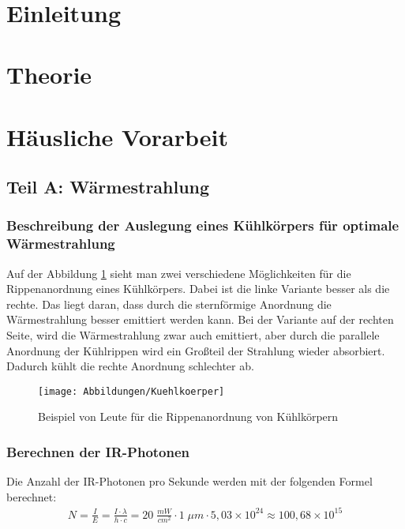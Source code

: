 \documentclass[a4paper]{scrartcl}
\def\header#1#2{
  \begin{center}
    {\Large #1}\\
    {#2}
  \end{center}
}
\numberwithin{equation}{subsection}
\begin{document}
\vspace{10pt}
\header{\HEADDING}{\SUBHEADDING}

\tableofcontents

\newpage

\section{Einleitung}

\newpage
\section{Theorie}

\newpage
\section{Häusliche Vorarbeit}
\subsection{Teil A: Wärmestrahlung}
\subsubsection{Beschreibung der Auslegung eines Kühlkörpers für optimale Wärmestrahlung}
Auf der Abbildung \ref{fig:kuehl} sieht man zwei verschiedene Möglichkeiten für die Rippenanordnung eines 
Kühlkörpers. Dabei ist die linke Variante besser als die rechte. Das liegt daran, dass durch die 
sternförmige Anordnung die Wärmestrahlung besser emittiert werden kann. Bei der Variante auf der rechten
Seite, wird die Wärmestrahlung zwar auch emittiert, aber durch die parallele Anordnung der Kühlrippen
wird ein Großteil der Strahlung wieder absorbiert. Dadurch kühlt die rechte Anordnung schlechter ab.

\begin{figure}[H]
\texttt{[image: Abbildungen/Kuehlkoerper]}
\centering
\caption{Beispiel von Leute für die Rippenanordnung von Kühlkörpern}
\centering
\label{fig:kuehl}
\end{figure}

\subsubsection{Berechnen der IR-Photonen}
Die Anzahl der IR-Photonen pro Sekunde werden mit der folgenden Formel berechnet:
\begin{align*}
N = \frac{I}{E} = \frac{I\cdot \lambda}{h\cdot c} = 20\;\frac{mW}{cm^2} \cdot 1\;\mu m \cdot 5,03\times 
10^{24} \approx 100,68\times 10^{15}
\end{align*}
\end{document}

